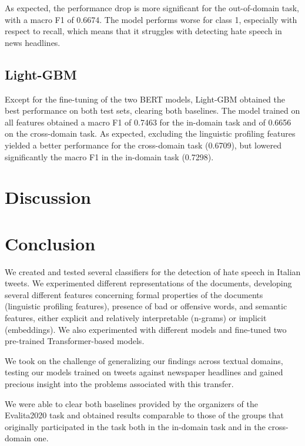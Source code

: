 \documentclass[a4paper, 9pt, twocolumn, DIV=calc]{scrartcl}
\begin{document}
As expected, the performance drop is more significant for the out-of-domain task, with a macro F1 of 0.6674. The model performs worse for class 1, especially with respect to recall, which means that it struggles with detecting hate speech in news headlines.


\subsection{Light-GBM}
Except for the fine-tuning of the two BERT models, Light-GBM obtained the best performance on both test sets, clearing both baselines.
The model trained on all features obtained a macro F1 of 0.7463 for the in-domain task and of 0.6656 on the cross-domain task.
As expected, excluding the linguistic profiling features yielded a better performance for the cross-domain task (0.6709), but lowered significantly the macro F1 in the in-domain task (0.7298).



\section{Discussion}


\section{Conclusion}
We created and tested several classifiers for the detection of hate speech in Italian tweets.
We experimented different representations of the documents, developing several different features concerning formal properties of the documents (linguistic profiling features), presence of bad or offensive words, and semantic features, either explicit and relatively interpretable (n-grams) or implicit (embeddings).
We also experimented with different models and fine-tuned two pre-trained Transformer-based models.

We took on the challenge of generalizing our findings across textual domains, testing our models trained on tweets against newspaper headlines and gained precious insight into the problems associated with this transfer.

We were able to clear both baselines provided by the organizers of the Evalita2020 task and obtained results comparable to those of the groups that originally participated in the task both in the in-domain task and in the cross-domain one.

\printbibliography{}
\end{document}
